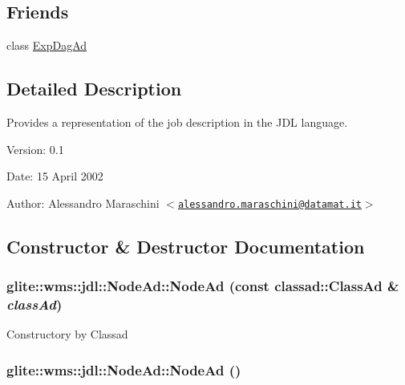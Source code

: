 \subsection*{Friends}
\begin{CompactItemize}
\item 
class \hyperlink{classglite_1_1wms_1_1jdl_1_1NodeAd_n0}{Exp\-Dag\-Ad}
\end{CompactItemize}


\subsection{Detailed Description}
Provides a representation of the job description in the JDL language. 

\begin{Desc}
\item[Version:]0.1 \end{Desc}
\begin{Desc}
\item[Date:]15 April 2002 \end{Desc}
\begin{Desc}
\item[Author:]Alessandro Maraschini $<$\href{mailto:alessandro.maraschini@datamat.it}{\tt alessandro.maraschini@datamat.it}$>$ \end{Desc}




\subsection{Constructor \& Destructor Documentation}
\hypertarget{classglite_1_1wms_1_1jdl_1_1NodeAd_a0}{
\subsubsection[NodeAd]{\setlength{\rightskip}{0pt plus 5cm}glite::wms::jdl::Node\-Ad::Node\-Ad (const classad::Class\-Ad \& {\em class\-Ad})}}
\label{classglite_1_1wms_1_1jdl_1_1NodeAd_a0}


Constructory by Classad\hypertarget{classglite_1_1wms_1_1jdl_1_1NodeAd_a1}{
\subsubsection[NodeAd]{\setlength{\rightskip}{0pt plus 5cm}glite::wms::jdl::Node\-Ad::Node\-Ad ()}}
\label{classglite_1_1wms_1_1jdl_1_1NodeAd_a1}


